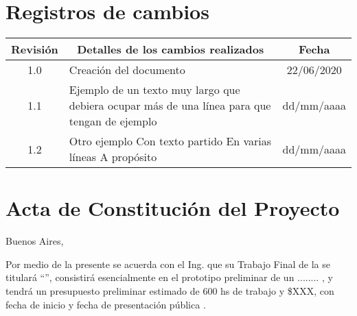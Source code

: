 \documentclass[11pt]{charter}
\begin{document}
\maketitle
\thispagestyle{empty}
\pagebreak


\thispagestyle{empty}
\tableofcontents{}
\pagebreak


\section{Registros de cambios}
\label{sec:registro}


\begin{table}[ht]
\label{tab:registro}
\centering

\begin{tabularx}{\linewidth}{@{}|c|X|c|@{}}
\hline
\rowcolor[HTML]{C0C0C0} 
Revisión & \multicolumn{1}{c|}{\cellcolor[HTML]{C0C0C0}Detalles de los cambios realizados} & Fecha      \\ \hline
1.0      & Creación del documento                                                          & 22/06/2020 \\ \hline
1.1      & Ejemplo de un texto muy largo que debiera ocupar más de una línea para que tengan de ejemplo                                                                                																						   & dd/mm/aaaa \\ \hline
1.2      & Otro ejemplo \newline
		   Con texto partido \newline
		   En varias líneas \newline
		   A propósito                                                                     & dd/mm/aaaa       \\ \hline
\end{tabularx}%
\end{table}

\pagebreak



\section{Acta de Constitución del Proyecto}
\label{sec:acta}

\begin{flushright}
Buenos Aires, \fechaINICIOname
\end{flushright}

\vspace{2cm}

Por medio de la presente se acuerda con el Ing. \authorname\hspace{1px} que su Trabajo Final de la \degreename\hspace{1px} se titulará ``\ttitle'', consistirá esencialmente en el prototipo preliminar de un ........ , y tendrá un presupuesto preliminar estimado de 600 hs de trabajo y \$XXX, con fecha de inicio \fechaINICIOname\hspace{1px} y fecha de presentación pública \fechaFINALname.
\end{document}
